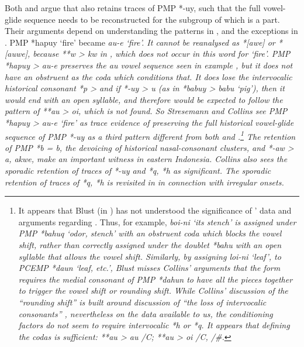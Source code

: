 Both \citet[139]{Stresemann1927} and \citet[51f]{Collins1983} argue
that  also retains traces of PMP *-uy,
such that the full vowel-glide sequence needs to be reconstructed
for the  subgroup of which  is a part.
Their arguments depend on understanding the patterns in ,
and the exceptions in .
PMP *hapuy ‘fire’ became  \it{au-e} ‘fire’.
It cannot be reanalysed as *[awe] or *[auwe],
because **w > \it{kw} in ,
which does not occur in this word for ‘fire’.
PMP *hapuy > \it{au-e} preserves the \it{au} vowel sequence seen
in example , but it does not have an obstruent as the coda which conditions that.
It does lose the intervocalic historical consonant *p > {\0}
and if *-uy > \it{u} (as in *babuy > \it{babu} ‘pig’),
then it would end with an open syllable,
and therefore would be expected to follow the pattern of **au
> \it{oi}, which is not found.
So Stresemann and Collins see PMP *hapuy >  \it{au-e} ‘fire’
as trace evidence of preserving the full historical vowel-glide
sequence of PMP *-uy as a third pattern different from both 
and .\footnote{
		It appears that Blust (in \citealp{BlustTrussel2020})
		has not understood the significance of \citeauthor{Collins1983}’
		\citeyear[40--52]{Collins1983} data and arguments regarding .
		Thus, for example,  \it{boi-ni} ‘its stench’ is assigned
		under PMP *bahuq ‘odor,
		stench’ with an obstruent coda which blocks the vowel shift,
		rather than correctly assigned under the doublet *bahu with an
		open syllable that allows the vowel shift.
		Similarly, by assigning  \it{loi-ni} ‘leaf’,
		to PCEMP *daun ‘leaf,
		etc.’, Blust misses Collins’ arguments that the  form requires
		the medial consonant of PMP *dahun to have all the pieces together
		to trigger the vowel shift or rounding shift.
		While Collins' discussion of the “rounding shift” is built around
		discussion of “the loss of intervocalic consonants” \citep[41ff]{Collins1983},
		nevertheless on the data available to us,
		the conditioning factors do not seem to require intervocalic *h or *q.
		It appears that defining the codas is sufficient: **au > \it{au}
		/{\gap}C\tsc{[+obstruent]}{\#}; **au > \it{oi} /{\gap}C\tsc{[+continuant]}{\#},
		/{\gap}{\#}.} 
The retention of PMP *b = \it{b},
the devoicing of historical nasal-consonant clusters,
and *-aw > \it{a,
akwe}, make  an important witness in eastern Indonesia.
Collins also sees the sporadic retention of traces of *-uy
and *q, *h as significant.
The sporadic retention of traces of *q,
*h is revisited in  in connection with irregular onsets.
